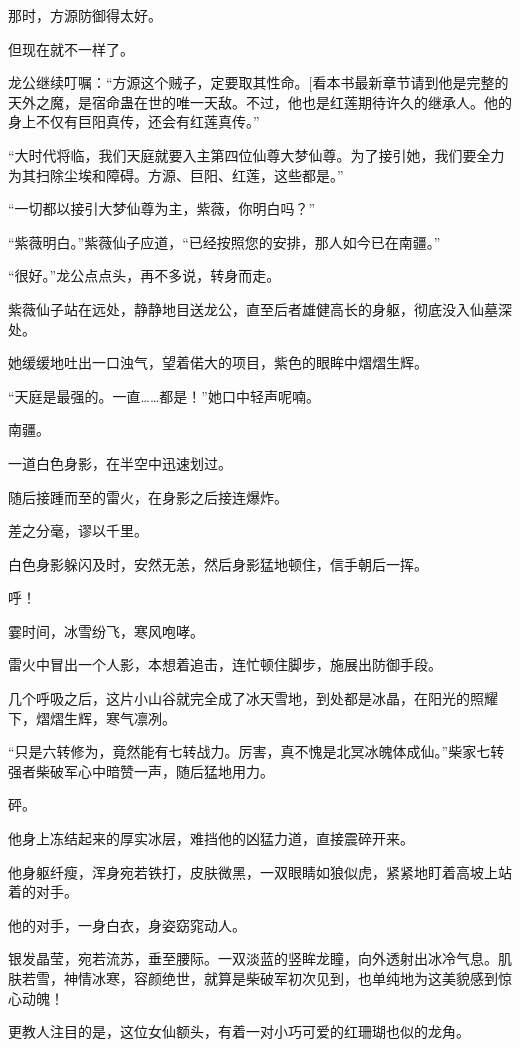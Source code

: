 \begin{this_body}
那时，方源防御得太好。

但现在就不一样了。

龙公继续叮嘱：“方源这个贼子，定要取其性命。[看本书最新章节请到他是完整的天外之魔，是宿命蛊在世的唯一天敌。不过，他也是红莲期待许久的继承人。他的身上不仅有巨阳真传，还会有红莲真传。”

“大时代将临，我们天庭就要入主第四位仙尊大梦仙尊。为了接引她，我们要全力为其扫除尘埃和障碍。方源、巨阳、红莲，这些都是。”

“一切都以接引大梦仙尊为主，紫薇，你明白吗？”

“紫薇明白。”紫薇仙子应道，“已经按照您的安排，那人如今已在南疆。”

“很好。”龙公点点头，再不多说，转身而走。

紫薇仙子站在远处，静静地目送龙公，直至后者雄健高长的身躯，彻底没入仙墓深处。

她缓缓地吐出一口浊气，望着偌大的项目，紫色的眼眸中熠熠生辉。

“天庭是最强的。一直……都是！”她口中轻声呢喃。

南疆。

一道白色身影，在半空中迅速划过。

随后接踵而至的雷火，在身影之后接连爆炸。

差之分毫，谬以千里。

白色身影躲闪及时，安然无恙，然后身影猛地顿住，信手朝后一挥。

呼！

霎时间，冰雪纷飞，寒风咆哮。

雷火中冒出一个人影，本想着追击，连忙顿住脚步，施展出防御手段。

几个呼吸之后，这片小山谷就完全成了冰天雪地，到处都是冰晶，在阳光的照耀下，熠熠生辉，寒气凛冽。

“只是六转修为，竟然能有七转战力。厉害，真不愧是北冥冰魄体成仙。”柴家七转强者柴破军心中暗赞一声，随后猛地用力。

砰。

他身上冻结起来的厚实冰层，难挡他的凶猛力道，直接震碎开来。

他身躯纤瘦，浑身宛若铁打，皮肤微黑，一双眼睛如狼似虎，紧紧地盯着高坡上站着的对手。

他的对手，一身白衣，身姿窈窕动人。

银发晶莹，宛若流苏，垂至腰际。一双淡蓝的竖眸龙瞳，向外透射出冰冷气息。肌肤若雪，神情冰寒，容颜绝世，就算是柴破军初次见到，也单纯地为这美貌感到惊心动魄！

更教人注目的是，这位女仙额头，有着一对小巧可爱的红珊瑚也似的龙角。


\end{this_body}
